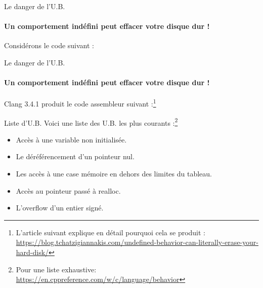
\begin{frame}{Le danger de l'U.B.}
	\framesubtitle{Un comportement indéfini peut effacer votre disque dur !}
	Considérons le code suivant :
	\ubdisk
\end{frame}

\begin{frame}{Le danger de l'U.B.}
	\framesubtitle{Un comportement indéfini peut effacer votre disque dur !}
	Clang 3.4.1 produit le code assembleur suivant :\footnote[frame]{L'article suivant explique en détail pourquoi cela se produit : \url{https://blog.tchatzigiannakis.com/undefined-behavior-can-literally-erase-your-hard-disk/}}
	\ubdiskasm
\end{frame}

\begin{frame}{Liste d'U.B.}
	Voici une liste des U.B. les plus courants :\footnote[frame]{Pour une liste exhaustive: \url{https://en.cppreference.com/w/c/language/behavior}}
	\begin{itemize}
		\item Accès à une variable non initialisée.
		\item Le déréférencement d'un pointeur nul.
		\item Les accès à une case mémoire en dehors des limites du tableau.
		\item Accès au pointeur passé à realloc.
		\item L'overflow d'un entier signé.
	\end{itemize}
\end{frame}